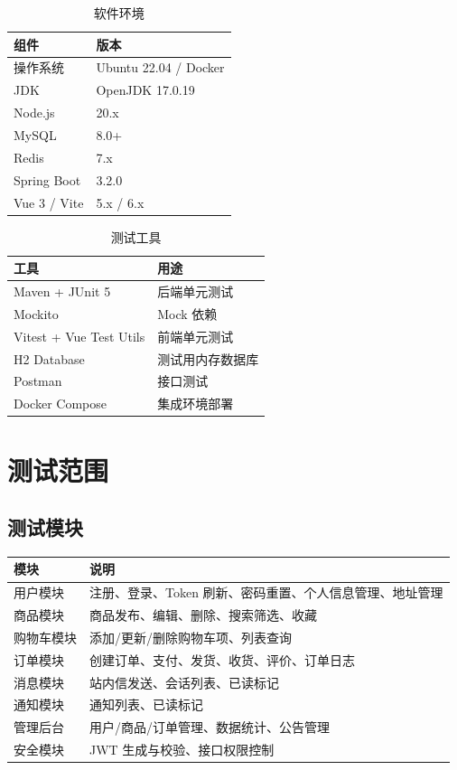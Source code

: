 \documentclass[12pt,a4paper,UTF8]{ctexart}
\begin{document}
\begin{table}[H]
\centering
\caption{软件环境}
\begin{tabularx}{\textwidth}{lX}
\toprule
\textbf{组件} & \textbf{版本} \\
\midrule
操作系统 & Ubuntu 22.04 / Docker \\
JDK & OpenJDK 17.0.19 \\
Node.js & 20.x \\
MySQL & 8.0+ \\
Redis & 7.x \\
Spring Boot & 3.2.0 \\
Vue 3 / Vite & 5.x / 6.x \\
\bottomrule
\end{tabularx}
\end{table}

\begin{table}[H]
\centering
\caption{测试工具}
\begin{tabularx}{\textwidth}{lX}
\toprule
\textbf{工具} & \textbf{用途} \\
\midrule
Maven + JUnit 5 & 后端单元测试 \\
Mockito & Mock 依赖 \\
Vitest + Vue Test Utils & 前端单元测试 \\
H2 Database & 测试用内存数据库 \\
Postman & 接口测试 \\
Docker Compose & 集成环境部署 \\
\bottomrule
\end{tabularx}
\end{table}

\section{测试范围}

\subsection{测试模块}

\begin{table}[H]
\centering
\begin{tabularx}{\textwidth}{lX}
\toprule
\textbf{模块} & \textbf{说明} \\
\midrule
用户模块 & 注册、登录、Token 刷新、密码重置、个人信息管理、地址管理 \\
商品模块 & 商品发布、编辑、删除、搜索筛选、收藏 \\
购物车模块 & 添加/更新/删除购物车项、列表查询 \\
订单模块 & 创建订单、支付、发货、收货、评价、订单日志 \\
消息模块 & 站内信发送、会话列表、已读标记 \\
通知模块 & 通知列表、已读标记 \\
管理后台 & 用户/商品/订单管理、数据统计、公告管理 \\
安全模块 & JWT 生成与校验、接口权限控制 \\
\bottomrule
\end{tabularx}
\end{table}
\end{document}
